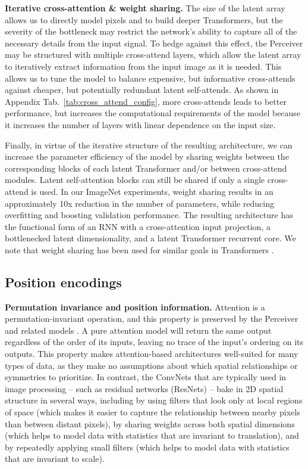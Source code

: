  \textbf{Iterative cross-attention \& weight sharing.} The size of the latent array allows us to directly model pixels and to build deeper Transformers, but the severity of the bottleneck may restrict the network's ability to capture all of the necessary details from the input signal. To hedge against this effect, the Perceiver may be structured with multiple cross-attend layers, which allow the latent array to iteratively extract information from the input image as it is needed. This allows us to tune the model to balance expensive, but informative cross-attends against cheaper, but potentially redundant latent self-attends. As shown in Appendix Tab.~\ref{tab:cross_attend_config}, more cross-attends leads to better performance, but increases the computational requirements of the model because it increases the number of layers with linear dependence on the input size.

Finally, in virtue of the iterative structure of the resulting architecture, we can increase the parameter efficiency of the model by sharing weights between the corresponding blocks of each latent Transformer and/or between cross-attend modules. Latent self-attention blocks can still be shared if only a single cross-attend is used. In our ImageNet experiments, weight sharing results in an approximately 10x reduction in the number of parameters, while reducing overfitting and boosting validation performance. The resulting architecture has the functional form of an RNN with a cross-attention input projection, a bottlenecked latent dimensionality, and a latent Transformer recurrent core. We note that weight sharing has been used for similar goals in Transformers \cite{dehghani2019universal, lan2020albert}.

\subsection{Position encodings}
\label{sec:pos_encodings}

 \textbf{Permutation invariance and position information.} Attention is a permutation-invariant operation, and this property is preserved by the Perceiver and related models \cite{lee2019set}. A pure attention model will return the same output regardless of the order of its inputs, leaving no trace of the input's ordering on its outputs. This property makes attention-based architectures well-suited for many types of data, as they make no assumptions about which spatial relationships or symmetries to prioritize. In contrast, the ConvNets that are typically used in image processing -- such as residual networks (ResNets) \cite{he2016deep} -- bake in 2D spatial structure in several ways, including by using filters that look only at local regions of space (which makes it easier to capture the relationship between nearby pixels than between distant pixels), by sharing weights across both spatial dimensions (which helps to model data with statistics that are invariant to translation), and by repeatedly applying small filters (which helps to model data with statistics that are invariant to scale).

